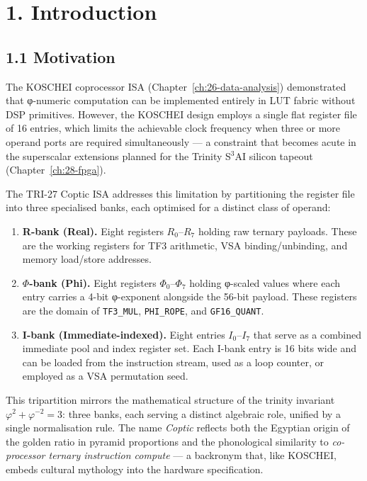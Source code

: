 \section{1. Introduction}\label{fa_71:introduction}

\subsection{1.1 Motivation}\label{fa_71:motivation}

The KOSCHEI coprocessor ISA (Chapter~\ref{ch:26-data-analysis})
demonstrated that φ-numeric computation can be implemented
entirely in LUT fabric without DSP primitives. However, the
KOSCHEI design employs a single flat register file of 16 entries,
which limits the achievable clock frequency when three or more
operand ports are required simultaneously --- a constraint that
becomes acute in the superscalar extensions planned for the
Trinity S$^3$AI silicon tapeout (Chapter~\ref{ch:28-fpga}).

The TRI-27 Coptic ISA addresses this limitation by partitioning
the register file into three specialised banks, each optimised
for a distinct class of operand:

\begin{enumerate}
\def\labelenumi{\arabic{enumi}.}
\item
  \textbf{R-bank (Real).} Eight registers
  \(R_0\)--\(R_7\) holding raw ternary payloads. These
  are the working registers for TF3 arithmetic, VSA
  binding/unbinding, and memory load/store addresses.
\item
  \textbf{$\Phi$-bank (Phi).} Eight registers
  \(\Phi_0\)--\(\Phi_7\) holding φ-scaled values where
  each entry carries a 4-bit φ-exponent alongside the
  56-bit payload. These registers are the domain of
  \texttt{TF3\_MUL}, \texttt{PHI\_ROPE}, and
  \texttt{GF16\_QUANT}.
\item
  \textbf{I-bank (Immediate-indexed).} Eight entries
  \(I_0\)--\(I_7\) that serve as a combined immediate
  pool and index register set. Each I-bank entry is 16
  bits wide and can be loaded from the instruction
  stream, used as a loop counter, or employed as a VSA
  permutation seed.
\end{enumerate}

This tripartition mirrors the mathematical structure of the
trinity invariant \(\varphi^2 + \varphi^{-2} = 3\): three banks,
each serving a distinct algebraic role, unified by a single
normalisation rule. The name \emph{Coptic} reflects both the
Egyptian origin of the golden ratio in pyramid proportions and
the phonological similarity to \emph{co-processor ternary
instruction compute} --- a backronym that, like KOSCHEI, embeds
cultural mythology into the hardware specification.

